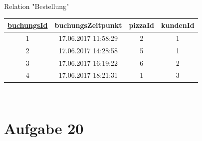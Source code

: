 Relation "Bestellung"\\
\begin{tabular} {|c|c|c|c|}
	\rowcolor{Gray}\hline
	\underline{buchungsId}&buchungsZeitpunkt \phantom{a}&pizzaId&kundenId\\\hline
	1&17.06.2017 11:58:29&2&1\\\hline
	2&17.06.2017 14:28:58&5&1\\\hline
	3&17.06.2017 16:19:22&6&2\\\hline
	4&17.06.2017 18:21:31&1&3\\\hline
\end{tabular}\\
\pagebreak

\pagebreak

\pagebreak

\pagebreak
\section*{Aufgabe 20}

